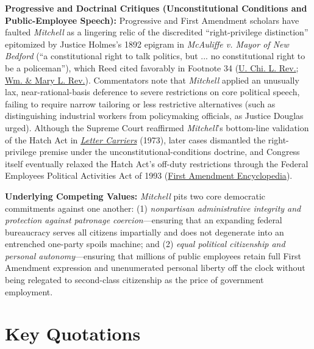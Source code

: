 \documentclass[12pt]{article}
\begin{document}
\textbf{Progressive and Doctrinal Critiques (Unconstitutional Conditions and Public-Employee Speech):} Progressive and First Amendment scholars have faulted \textit{Mitchell} as a lingering relic of the discredited ``right-privilege distinction'' epitomized by Justice Holmes's 1892 epigram in \textit{McAuliffe v. Mayor of New Bedford} (``a constitutional right to talk politics, but ... no constitutional right to be a policeman''), which Reed cited favorably in Footnote 34 (\href{https://chicagounbound.uchicago.edu/cgi/viewcontent.cgi?article=4265&context=uclrev}{U. Chi. L. Rev.}; \href{https://scholarship.law.wm.edu/cgi/viewcontent.cgi?article=2634&context=wmlr}{Wm. \& Mary L. Rev.}). Commentators note that \textit{Mitchell} applied an unusually lax, near-rational-basis deference to severe restrictions on core political speech, failing to require narrow tailoring or less restrictive alternatives (such as distinguishing industrial workers from policymaking officials, as Justice Douglas urged). Although the Supreme Court reaffirmed \textit{Mitchell}'s bottom-line validation of the Hatch Act in \href{https://www.law.cornell.edu/supremecourt/text/413/548}{\textit{Letter Carriers}} (1973), later cases dismantled the right-privilege premise under the unconstitutional-conditions doctrine, and Congress itself eventually relaxed the Hatch Act's off-duty restrictions through the Federal Employees Political Activities Act of 1993 (\href{https://firstamendment.mtsu.edu/article/united-public-workers-of-america-v-mitchell/}{First Amendment Encyclopedia}).

\textbf{Underlying Competing Values:} \textit{Mitchell} pits two core democratic commitments against one another: (1) \textit{nonpartisan administrative integrity and protection against patronage coercion}---ensuring that an expanding federal bureaucracy serves all citizens impartially and does not degenerate into an entrenched one-party spoils machine; and (2) \textit{equal political citizenship and personal autonomy}---ensuring that millions of public employees retain full First Amendment expression and unenumerated personal liberty off the clock without being relegated to second-class citizenship as the price of government employment.

\section{Key Quotations}
\end{document}
